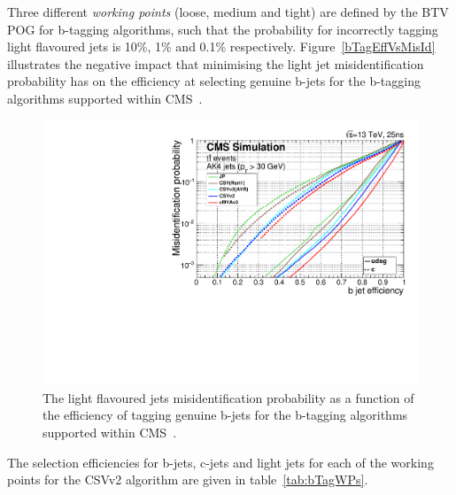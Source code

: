 Three different \emph{working points} (loose, medium and tight) are defined by the BTV POG for b-tagging algorithms, such that the probability for incorrectly tagging light flavoured jets is 10\%, 1\% and 0.1\% respectively.
Figure~\ref{bTagEffVsMisId} illustrates the negative impact that minimising the light jet misidentification probability has on the efficiency at selecting genuine b-jets for the b-tagging algorithms supported within CMS~\cite{Sirunyan:2017ezt}.

\begin{figure}[tbp]
\centering
\includegraphics[width=\textwidth]{figs/data-mc/effVsMisTagcsvV2.pdf}
\caption{The light flavoured jets misidentification probability as a function of the efficiency of tagging genuine b-jets for the b-tagging algorithms supported within CMS~\cite{Sirunyan:2017ezt}.}
\label{fig:bTagEffVsMisId}
\end{figure}

The selection efficiencies for b-jets, c-jets and light jets for each of the working points for the CSVv2 algorithm are given in table~\ref{tab:bTagWPs}.

